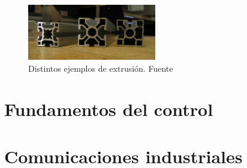 \begin{itemize}
    \begin{figure}[H]
            \centering
            \includegraphics[width=0.5\textwidth]{images/Extruded_aluminium_section.jpg}
            \caption{Distintos ejemplos de extrusión. Fuente \cite{ejemplosextrusion}}
            \label{fig:estado_ejemplos}
    \end{figure}
\end{itemize}

\section{Fundamentos del control}
\label{arte_control}
\section{Comunicaciones industriales}
\label{arte_comunicaciones}
